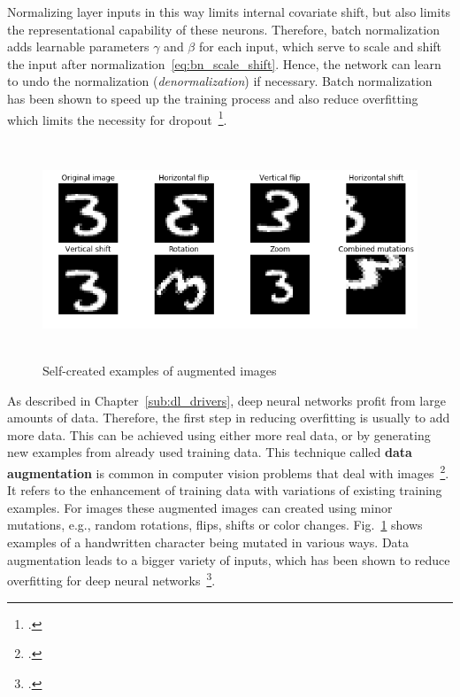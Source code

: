 Normalizing layer inputs in this way limits internal covariate shift, but also
limits the representational capability of these neurons.
Therefore, batch normalization adds learnable parameters $\gamma$ and $\beta$ for
each input, which serve to scale and shift the input after normalization~\ref{eq:bn_scale_shift}.
Hence, the network can learn to undo the normalization (\textit{denormalization})
if necessary.
Batch normalization has been shown to speed up the training process and also
reduce overfitting which limits the necessity for dropout~\footcite{Ioffe2015}.

\begin{figure}[h]
  \includegraphics[height=6.5cm]{img/data_augmentation}
  \caption{Self-created examples of augmented images}
\label{fig:augmented_images}
\end{figure}

As described in Chapter~\ref{sub:dl_drivers}, deep neural networks profit from
large amounts of data.
Therefore, the first step in reducing overfitting is usually to add
more data.
This can be achieved using either more real data, or by generating new examples
from already used training data.
This technique called \textbf{data augmentation} is common in computer vision
problems that deal with images~\footcite{Simard2003}.
It refers to the enhancement of training data with variations of existing training
examples.
For images these augmented images can created using minor mutations, e.g., random rotations, flips, shifts or
color changes.
Fig.~\ref{fig:augmented_images} shows examples of a handwritten character being
mutated in various ways.
Data augmentation leads to a bigger variety of inputs, which has been shown
to reduce overfitting for deep neural networks~\footcite{Krizhevsky2012}.
